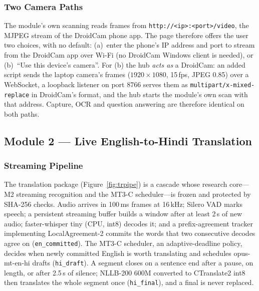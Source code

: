 \documentclass[12pt,singleside,a4paper]{article}
\begin{document}
\subsubsection{Two Camera Paths}
The module's own scanning reads frames from \texttt{http://<ip>:<port>/video}, the MJPEG stream of the DroidCam phone app. The page therefore offers the user two choices, with no default: (a)~enter the phone's IP address and port to stream from the DroidCam app over Wi-Fi (no DroidCam Windows client is needed), or (b)~``Use this device's camera''. For (b) the hub \emph{acts as} a DroidCam: an added script sends the laptop camera's frames ($1920\times1080$, 15\,fps, JPEG 0.85) over a WebSocket, a loopback listener on port 8766 serves them as \texttt{multipart/x-mixed-replace} in DroidCam's format, and the hub starts the module's own scan with that address. Capture, OCR and question answering are therefore identical on both paths.

\subsection{Module 2 --- Live English-to-Hindi Translation}
\subsubsection{Streaming Pipeline}
The translation package (Figure~\ref{fig:trpipe}) is a cascade whose research core---M2 streaming recognition and the MT3-C scheduler---is frozen and protected by SHA-256 checks. Audio arrives in 100\,ms frames at 16\,kHz; Silero VAD \cite{silero} marks speech; a persistent streaming buffer builds a window after at least 2\,s of new audio; faster-whisper tiny (CPU, int8) \cite{radford2023} decodes it; and a prefix-agreement tracker implementing LocalAgreement-2 \cite{machacek2023} commits the words that two consecutive decodes agree on (\texttt{en\_committed}). The MT3-C scheduler, an adaptive-deadline policy, decides when newly committed English is worth translating and schedules opus-mt-en-hi \cite{tiedemann2020} drafts (\texttt{hi\_draft}). A segment closes on a sentence end after a pause, on length, or after 2.5\,s of silence; NLLB-200 600M \cite{nllb2022} converted to CTranslate2 int8 then translates the whole segment once (\texttt{hi\_final}), and a final is never replaced.
\end{document}
